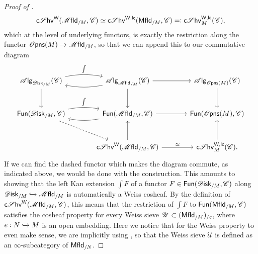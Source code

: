 \documentclass[../text]{subfiles}
\begin{document}
\begin{proof}[Proof of {}]
\begin{equation}
        \csheaves[W](\mfld_{/M}, \catC) \simeq \csheaves[W, lc](\mfld[r]_{/M}, \catC) =: \csheaves[W, lc]_M(\catC),
    \end{equation}
    which at the level of underlying functors, is exactly the restriction along the functor $\opens(M) \xrightarrow{} \mfld_{/M}$, so that we can append this to our commutative diagram
    \begin{equation}
        \begin{tikzcd}[row sep = large, column sep = large]
            \alg{\disk_{/M}} (\catC) \arrow[r, bend left=10, "\int"] \arrow[d] & \alg{\mfld_{/M}} (\catC) \arrow[l, bend left=10] \arrow[r] \arrow[d] & \alg{\opens(M)} (\catC) \arrow[d] \\
            \mathsf{Fun}(\disk_{/M}, \catC) \arrow[r, bend left=10, "\int"] \arrow[dr, dashed] & \mathsf{Fun}(\mfld_{/M}, \catC) \arrow[l, bend left=10] \arrow[r] & \mathsf{Fun}(\opens(M), \catC) \\
            & \csheaves[W](\mfld_{/M}, \catC) \arrow[r, "\simeq"] \arrow[u] & \csheaves[W, lc]_M(\catC) \arrow[u].
        \end{tikzcd}
    \end{equation}
    If we can find the dashed functor which makes the diagram commute, as indicated above, we would be done with the construction. This amounts to showing that the left Kan extension $\int F$ of a functor $F \in \mathsf{Fun}(\disk_{/M}, \catC)$ along $\disk_{/M} \xhookrightarrow{} \mfld_{/M}$ is automatically a Weiss cosheaf. By the definition of $\csheaves[W](\mfld_{/M}, \catC)$, this means that the restriction of $\int F$ to $\mathsf{Fun}(\mfld[r]_{/M}, \catC)$ satisfies the cosheaf property for every Weiss sieve $\mathscr{U} \subset (\mfld[r]_{/M})_{/e}$, where $e:N \xhookrightarrow{} M$ is an open embedding. Here we notice that for the Weiss property to even make sense, we are implicitly using , so that the Weiss sieve $\mathscr{U}$ is defined as an $\infty$-subcategory of $\mfld[r]_{/N}$.
    

\end{proof}
\end{document}
